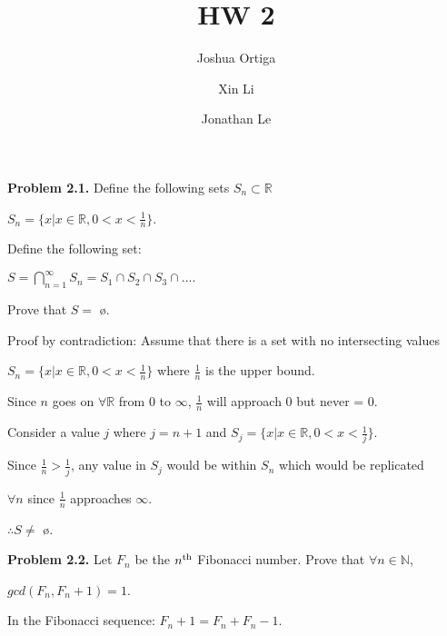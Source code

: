 \documentclass{article}
\title{HW 2}
\author{Joshua Ortiga \\
		\and
		Xin Li \\
		\and
		Jonathan Le}
\begin{document}
\maketitle
\textbf{Problem 2.1.} Define the following sets $S_n \subset \mathbb{R}$

\begin{center}
	$S_n = \{x|x \in \mathbb{R}, 0 < x < \frac{1}{n}\}$.
\end{center}

\hspace{1cm} Define the following set:

\begin{center}
	$S = \displaystyle\bigcap_{n=1}^{\infty} S_n = S_1 \cap S_2 \cap S_3 \cap ....$
\end{center}

\hspace{1cm} Prove that $S = $ \o.

\vspace{0.5cm}

Proof by contradiction: Assume that there is a set with no intersecting values 

\vspace{0.2cm}

$S_n = \{ x | x \in \mathbb{R}, 0 < x < \frac{1}{n}\}$ where $\frac{1}{n}$ is the upper bound.

\vspace{0.2cm}

Since $n$ goes on $\forall \mathbb{R}$ from 0 to $\infty$, $\frac{1}{n}$ will approach 0 but never = 0.

\vspace{0.2cm}

Consider a value $j$ where $j=n+1$ and $S_j = \{x|x \in \mathbb{R}, 0 < x < \frac{1}{j} \}$.

Since $\frac{1}{n} > \frac{1}{j}$, any value in $S_j$ would be within $S_n$ which would be replicated

$\forall n$ since $\frac{1}{n}$ approaches $\infty$.

$\therefore S \not = $ \o.

\vspace{0.5cm}

\textbf{Problem 2.2.} Let $F_n$ be the $n\textsuperscript{th}$ Fibonacci number. Prove that $\forall n \in \mathbb{N}$, 

$gcd(F_n,F_n+1) = 1$.

\vspace{0.3cm}

In the Fibonacci sequence: $F_n+1 = F_n + F_n-1$.
\end{document}
